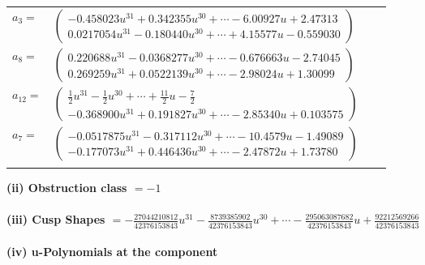 \documentclass[1p]{elsarticle_modified}
\theoremstyle{definition}
\begin{document}
\begin{tabular}{m{7pt} m{180pt} m{7pt} m{180pt} }
\flushright $a_{3}=$&$\begin{pmatrix}-0.458023 u^{31}+0.342355 u^{30}+\cdots-6.00927 u+2.47313\\0.0217054 u^{31}-0.180440 u^{30}+\cdots+4.15577 u-0.559030\end{pmatrix}$ \\
\flushright $a_{8}=$&$\begin{pmatrix}0.220688 u^{31}-0.0368277 u^{30}+\cdots-0.676663 u-2.74045\\0.269259 u^{31}+0.0522139 u^{30}+\cdots-2.98024 u+1.30099\end{pmatrix}$ \\
\flushright $a_{12}=$&$\begin{pmatrix}\frac{1}{2} u^{31}-\frac{1}{2} u^{30}+\cdots+\frac{11}{2} u-\frac{7}{2}\\-0.368900 u^{31}+0.191827 u^{30}+\cdots-2.85340 u+0.103575\end{pmatrix}$ \\
\flushright $a_{7}=$&$\begin{pmatrix}-0.0517875 u^{31}-0.317112 u^{30}+\cdots-10.4579 u-1.49089\\-0.177073 u^{31}+0.446436 u^{30}+\cdots-2.47872 u+1.73780\end{pmatrix}$\\&\end{tabular}
\flushleft \textbf{(ii) Obstruction class $= -1$}\\~\\
\flushleft \textbf{(iii) Cusp Shapes $= -\frac{27044210812}{42376153843} u^{31}-\frac{8739385902}{42376153843} u^{30}+\cdots-\frac{295063087682}{42376153843} u+\frac{92212569266}{42376153843}$}\\~\\
\newpage\renewcommand{\arraystretch}{1}
\flushleft \textbf{(iv) u-Polynomials at the component}\newline \\
\end{document}
